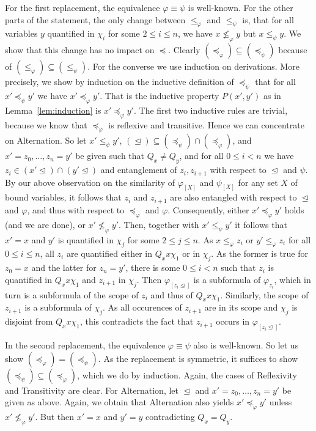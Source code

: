 \documentclass{LMCS}
\renewcommand{\phi}{\varphi}
\newcommand{\refl}{Reflexivity}
\newcommand{\trans}{Transitivity}
\newcommand{\alt}{Alternation}
\begin{document}
For the first replacement, the equivalence $\phi\equiv\psi$ is well-known. 
For the other parts of the statement, 
the only change between $\leq_{\phi}$ and $\leq_{\psi}$ is, 
that for all variables $y$ quantified in $\chi_i$ for some $2\leq i\leq n$, 
we have $x\not\leq_{\phi}y$ but $x\leq_{\psi}y$. 
We show that this change has no impact on $\preceq$. 
Clearly $(\preceq_{\phi})\subseteq(\preceq_{\psi})$ 
because of $(\leq_{\phi})\subseteq(\leq_{\psi})$. 
For the converse we use induction on derivations. 
More precisely, 
we show by induction on the inductive definition of $\preceq_{\psi}$ 
that for all $x'\preceq_{\psi}y'$ we have $x'\preceq_{\phi}y'$. 
That is the inductive property $P(x',y')$ as in Lemma~\ref{lem:induction} 
is $x'\preceq_{\phi}y'$. 
The first two inductive rules are trivial, 
because we know that $\preceq_{\phi}$ is reflexive and transitive. 
Hence we can concentrate on \alt{}. 
So let $x'\leq_{\psi}y'$, 
$(\trianglelefteq)\subseteq(\preceq_{\psi})\cap(\preceq_{\phi})$, 
and $x'=z_0,\ldots,z_n=y'$ be given such that $Q_x\not=Q_y$, 
and for all $0\leq i<n$ 
we have $z_i\in(x'\trianglelefteq)\cap(y'\trianglelefteq)$ 
and entanglement of $z_i,z_{i+1}$ with respect to $\trianglelefteq$ and $\psi$. 
By our above observation on the similarity of $\phi_{[X]}$ and $\psi_{[X]}$ 
for any set $X$ of bound variables, 
it follows that $z_i$ and $z_{i+1}$ 
are also entangled with respect to $\trianglelefteq$ and $\phi$, 
and thus with respect to $\preceq_{\phi}$ and $\phi$. 
Consequently, either $x'\preceq_{\phi}y'$ holds (and we are done), 
or $x'\not\leq_{\phi}y'$. 
Then, together with $x'\leq_{\psi}y'$ it follows that $x'=x$ 
and $y'$ is quantified in $\chi_j$ for some $2\leq j\leq n$. 
As $x\leq_{\phi}z_i$ or $y'\leq_{\phi}z_i$ for all $0\leq i\leq n$, 
all $z_i$ are quantified either in $Q_xx\chi_1$ or in $\chi_j$. 
As the former is true for $z_0=x$ and the latter for $z_n=y'$, 
there is some $0\leq i<n$ 
such that $z_i$ is quantified in $Q_xx\chi_1$ and $z_{i+1}$ in $\chi_j$. 
Then $\phi_{[z_i\trianglelefteq]}$ is a subformula of $\phi_{z_i}$, 
which in turn is a subformula of the scope of $z_i$ and thus of $Q_xx\chi_1$. 
Similarly, the scope of $z_{i+1}$ is a subformula of $\chi_j$. 
As all occurences of $z_{i+1}$ are in its scope 
and $\chi_j$ is disjoint from $Q_xx\chi_1$, 
this contradicts the fact that $z_{i+1}$ occurs in $\phi_{[z_i\trianglelefteq]}$. 


In the second replacement, the equivalence $\phi\equiv\psi$ also is well-known. 
So let us show $(\preceq_{\phi})=(\preceq_{\psi})$. 
As the replacement is symmetric, 
it suffices to show $(\preceq_{\psi})\subseteq(\preceq_{\phi})$, 
which we do by induction. 
Again, the cases of \refl{} and \trans{} are clear. 
For \alt, let $\trianglelefteq$ and $x'=z_0,\ldots,z_n=y'$ be given as above. 
Again, we obtain that \alt{} also yields $x'\preceq_{\phi}y'$ 
unless $x'\not\leq_{\phi}y'$. 
But then $x'=x$ and $y'=y$ contradicting $Q_x=Q_y$. 
\end{document}
